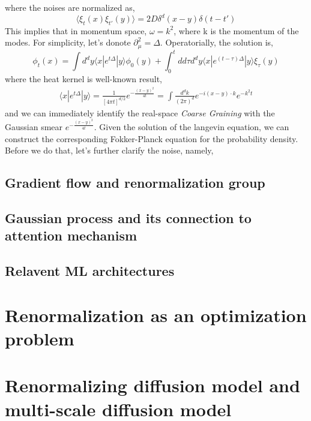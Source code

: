\documentclass[a4paper,11pt]{article}
\begin{document}
where the noises are normalized as,
\begin{equation}
\langle \xi_t(x) \xi_{t'}(y) \rangle=2D \delta^{d}(x-y)\delta(t-t')
\end{equation}
This implies that in momentum space, $\omega=k^2$, where k is the momentum of the modes. For simplicity, let's donote $\partial^2_\mu =\Delta$. Operatorially, the solution is,
\begin{equation}
\phi_t(x)=\int d^dy \langle  x|e^{t\Delta}| y\rangle \phi_0(y)+ \int_0^t d d\tau d^d y \langle  x|e^{(t-\tau)\Delta}| y\rangle \xi_\tau(y)
\end{equation}
where the heat kernel is well-known result,
\begin{equation}
\begin{split}
 \langle  x|e^{t\Delta}| y\rangle=\frac{1}{[4\pi t]^{d/2}} e^{-\frac{(x-y)^2}{4t}}=\int \frac{d ^dk}{(2\pi)^d} e^{-i(x-y)\cdot k}e^{-k^2 t}
\end{split}
\end{equation}
and we can immediately identify the real-space \textit{Coarse Graining} with the Gaussian smear $e^{-\frac{(x-y)^2}{4t}}$. Given the solution of the langevin equation, we can construct the corresponding Fokker-Planck equation for the probability density. Before we do that, let's further clarify the noise, namely,


\subsection{Gradient flow and renormalization group}

\subsection{Gaussian process and its connection to attention mechanism}

\subsection{Relavent ML architectures}


\newpage
\section{Renormalization as an optimization problem}


\newpage
\section{Renormalizing diffusion model and multi-scale diffusion model}



\end{document}

